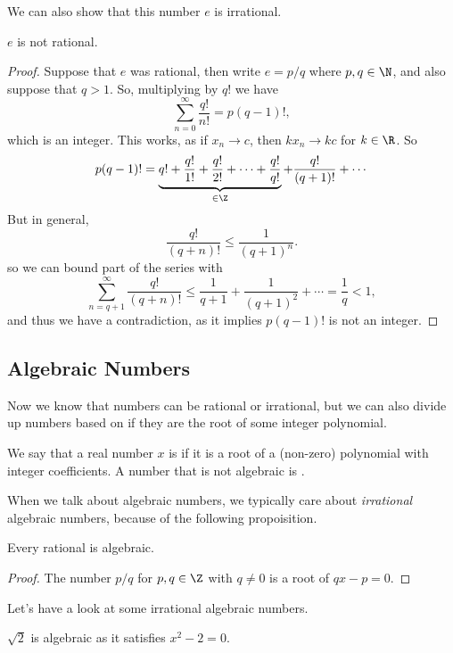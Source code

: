 We can also show that this number $e$ is irrational.

\begin{theorem}[Irrationality of $e$]
	$e$ is not rational.
\end{theorem}
\begin{proof}
	Suppose that $e$ was rational, then write $e = p/q$ where $p, q \in \N$, and also suppose that $q > 1$. So, multiplying by $q!$ we have
	$$
\sum_{n = 0}^{\infty} \frac{q!}{n!} = p(q - 1)!,
	$$
	which is an integer. This works, as if $x_n \rightarrow c$, then $k x_n \rightarrow kc$ for $k \in \R$. So
	$$
	p(q - 1)! = \underbrace{q! + \frac{q!}{1!}+ \frac{q!}{2!} + \dots +\frac{q!}{q!}}_{\in \Z} + \frac{q!}{(q+1)!} + \cdots
	$$
	But in general,
	$$
	\frac{q!}{(q + n)!} \leq \frac{1}{(q + 1)^n}.
	$$
	so we can bound part of the series with
	$$
	\sum_{n = q + 1}^\infty \frac{q!}{(q + n)!} \leq \frac{1}{q + 1} + \frac{1}{(q + 1)^2} + \cdots = \frac{1}{q} < 1,
	$$
	and thus we have a contradiction, as it implies $p(q - 1)!$ is not an integer.
\end{proof}

\subsection{Algebraic Numbers}

Now we know that numbers can be rational or irrational, but we can also divide up numbers based on if they are the root of some integer polynomial.

\begin{definition}[Algebraic]
We say that a real number $x$ is  if it is a root of a (non-zero) polynomial with integer coefficients. A number that is not algebraic is .	
\end{definition}

When we talk about algebraic numbers, we typically care about \emph{irrational} algebraic numbers, because of the following propoisition.

\begin{proposition}
	Every rational is algebraic.
\end{proposition}
\begin{proof}
	The number $p/q$ for $p, q \in \Z$ with $q \neq 0$ is a root of $qx - p = 0$.
\end{proof}

Let's have a look at some irrational algebraic numbers.

\begin{example}
	$\sqrt{2}$ is algebraic as it satisfies $x^2 - 2 = 0$.
\end{example}

